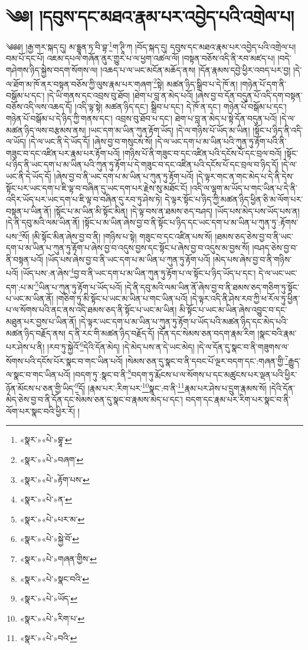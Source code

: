 \chapter{༄༅། །དབུས་དང་མཐའ་རྣམ་པར་འབྱེད་པའི་འགྲེལ་པ།}༄༅༅། །རྒྱ་གར་སྐད་དུ། མ་དྷྱཱན་ཏ་བི་བྷ་\footnote{«སྣར་»«པེ་»བྷཱ་}ག་ཊཱི་ཀ །བོད་སྐད་དུ། དབུས་དང་མཐའ་རྣམ་པར་འབྱེད་པའི་འགྲེལ་པ། བམ་པོ་དང་པོ། འཇམ་དཔལ་གཞོན་ནུར་གྱུར་པ་ལ་ཕྱག་འཚལ་ལོ། །བསྟན་བཅོས་འདི་ནི་རབ་མཛད་པ། །བདེ་གཤེགས་ཉིད་སྐྱེས་བདག་སོགས་ལ། །འཆད་པ་ལ་ཡང་མངོན་མཆོད་ནས། །དོན་རྣམས་དབྱེ་ཕྱིར་འབད་པར་བྱ། །དེ་ལ་ཐོག་མ་ཁོ་ནར་བསྟན་བཅོས་ཀྱི་ལུས་རྣམ་པར་གཞག་\footnote{«སྣར་»«པེ་»བཞག་}སྟེ། མཚན་ཉིད་སྒྲིབ་པ་དེ་ཁོ་ན། །གཉེན་པོ་དག་ནི་བསྒོམ་པ་དང་། །དེ་ཡི་གནས་དང་འབྲས་བུ་ཐོབ། །ཐེག་པ་བླ་ན་མེད་པའོ། །ཞེས་བྱ་བ་དོན་བདུན་པོ་འདི་དག་བསྟན་བཅོས་འདི་ལས་འཆད་དོ། །འདི་ལྟ་སྟེ། མཚན་ཉིད་དང་། སྒྲིབ་པ་དང་། དེ་ཁོ་ན་དང་། གཉེན་པོ་བསྒོམ་པ་དང་། གཉེན་པོ་བསྒོམ་པ་དེ་ཉིད་ཀྱི་གནས་དང་། འབྲས་བུ་ཐོབ་པ་དང་། ཐེག་པ་བླ་ན་མེད་པ་སྟེ་དོན་བདུན་པའོ། །དེ་ལ་མཚན་ཉིད་ལས་བརྩམས་ནས། །ཡང་དག་མ་ཡིན་ཀུན་རྟོག་ཡོད། །དེ་ལ་གཉིས་པོ་ཡོད་མ་ཡིན། །སྟོང་པ་ཉིད་ནི་འདི་ལ་ཡོད། །དེ་ལ་ཡང་ནི་དེ་ཡོད་དོ། །ཞེས་བྱ་བ་གསུངས་སོ། །དེ་ལ་ཡང་དག་པ་མ་ཡིན་པའི་ཀུན་ཏུ་རྟོག་པའི་ནི་གཟུང་བ་དང་འཛིན་པར་རྣམ་པར་རྟོག་པའོ། །གཉིས་པོ་ནི་གཟུང་བ་དང་འཛིན་པའི་དངོས་པོ་དང་བྲལ་བའོ། །སྟོང་པ་ཉིད་ནི་ཡང་དག་པ་མ་ཡིན་པའི་ཀུན་ཏུ་རྟོག་པ་དེ་གཟུང་བ་དང་འཛིན་པའི་དངོས་པོ་དང་བྲལ་བ་ཉིད་དོ། །དེ་ལ་ཡང་ནི་དེ་ཡོད་དོ། །ཞེས་བྱ་བ་ནི་ཡང་དག་པ་མ་ཡིན་པ་ཀུན་ཏུ་རྟོག་པའོ། །དེ་ལྟར་གང་ན་གང་མེད་པ་དེ་ནི་དེས་སྟོང་པར་ཡང་དག་པ་ཇི་ལྟ་བ་བཞིན་དུ་ཡང་དག་པར་རྗེས་སུ་མཐོང་ངོ། །འདི་ལ་ལྷག་མ་ཡོད་པ་གང་ཡིན་པ་དེ་ནི་འདིར་ཡོད་པར་ཡང་དག་པ་ཇི་ལྟ་བ་བཞིན་དུ་རབ་ཏུ་ཤེས་ཏེ། དེ་ལྟར་སྟོང་པ་ཉིད་ཀྱི་མཚན་ཉིད་ཕྱིན་ཅི་མ་ལོག་པར་བསྟན་པ་ཡིན་ནོ། །སྟོང་པ་མ་ཡིན་མི་སྟོང་མིན། །དེ་ལྟ་བས་ན་ཐམས་ཅད་བཤད། །ཡོད་པས་མེད་པས་ཡོད་པས་ན། །དེ་ནི་དབུ་མའི་ལམ་ཡིན་ནོ། །སྟོང་པ་མ་ཡིན་ཞེས་བྱ་བ་ནི་སྟོང་པ་ཉིད་དང་ཡང་དག་པ་མ་ཡིན་པ་ཀུན་ཏུ་:རྟོགས་པས་\footnote{«སྣར་»«པེ་»རྟོག་པས་}སོ། །མི་སྟོང་མིན་ཞེས་བྱ་བ་ནི། །གཉིས་པ་སྟེ། གཟུང་བ་དང་འཛིན་པས་སོ། །ཐམས་ཅད་ཅེས་བྱ་བ་ནི་ཡང་དག་པ་མ་ཡིན་པ་ཀུན་ཏུ་རྟོག་པ་ཞེས་བྱ་བ་འདུས་བྱས་དང་སྟོང་པ་ཞེས་བྱ་བ་འདུས་མ་བྱས་སོ། །བཤད་ཅེས་བྱ་བ་ནི་བསྟན་པའོ། །ཡོད་པས་ཞེས་བྱ་བ་ནི་ཡང་དག་པ་མ་ཡིན་པ་ཀུན་ཏུ་རྟོག་པའོ། །མེད་པས་ཞེས་བྱ་བ་ནི་གཉིས་པའོ། །ཡོད་པས་:ན་ཞེས་\footnote{«སྣར་»«པེ་»ན་}བྱ་བ་ནི་ཡང་དག་པ་མ་ཡིན་ཀུན་ཏུ་རྟོག་པ་ལ་སྟོང་པ་ཉིད་ཡོད་པ་དང་། དེ་ལ་ཡང་ཡང་དག་:པ་མ་\footnote{«སྣར་»«པེ་»པར་མ་}ཡིན་པ་ཀུན་ཏུ་རྟོག་པ་ཡོད་པའོ། །དེ་ནི་དབུ་མའི་ལམ་ཡིན་ནོ་ཞེས་བྱ་བ་ནི་ཐམས་ཅད་གཅིག་ཏུ་སྟོང་པ་ཡང་མ་ཡིན་ནོ། །གཅིག་ཏུ་མི་སྟོང་པ་ཡང་མ་ཡིན་པ་གང་ཡིན་པའོ། །དེ་ལྟར་འདི་ནི་ཤེས་རབ་ཀྱི་ཕ་རོལ་ཏུ་ཕྱིན་པ་ལ་སོགས་པའི་ནང་ནས་འདི་ཐམས་ཅད་ནི་སྟོང་པ་ཡང་མ་ཡིན། མི་སྟོང་པ་ཡང་མ་ཡིན་ཞེས་འབྱུང་བ་དང་མཐུན་པར་བྱས་པ་ཡིན་ནོ། །དེ་ལྟར་ཡང་དག་པ་མ་ཡིན་པ་ཀུན་ཏུ་རྟོག་པ་ཡོད་པའི་མཚན་ཉིད་དང་མེད་པའི་མཚན་ཉིད་བརྗོད་ནས། ད་ནི་རང་གི་མཚན་ཉིད་བརྗོད་དོ། །དོན་དང་སེམས་ཅན་བདག་རྣམ་རིག །སྣང་བའི་རྣམ་པར་ཤེས་པ་ནི། །རབ་ཏུ་སྐྱེའོ་\footnote{«སྣར་»«པེ་»སྐྱེ་བོ་}དེའི་དོན་མེད། །དེ་མེད་པས་ན་དེ་ཡང་མེད། །དེ་ལ་དོན་དུ་སྣང་བ་ནི་གཟུགས་ལ་སོགས་པའི་དངོས་པོར་སྣང་བ་གང་ཡིན་པའོ། །སེམས་ཅན་དུ་སྣང་བ་ནི་དབང་པོ་ལྔར་བདག་དང་:གཞན་གྱི་\footnote{«སྣར་»«པེ་»གཞན་གྱིས་}རྒྱུད་ལ་སྣང་བ་གང་ཡིན་པའོ། །བདག་ཏུ་:སྣང་བ་ནི་\footnote{«སྣར་»«པེ་»སྣང་བའི་}བདག་ཏུ་རྨོངས་པ་ལ་སོགས་པ་དང་མཚུངས་པར་ལྡན་པའི་ཕྱིར་ཉོན་མོངས་པ་ཅན་གྱི་ཡིད་\footnote{«སྣར་»«པེ་»ཡོད་}དོ། །རྣམ་པར་:རིག་པར་\footnote{«སྣར་»«པེ་»རིག་པ་}སྣང་:བ་ནི་\footnote{«སྣར་»«པེ་»བའི་}རྣམ་པར་ཤེས་པ་དྲུག་རྣམས་སོ། །དེའི་དོན་མེད་ཅེས་བྱ་བ་ནི་དོན་དང་སེམས་ཅན་དུ་སྣང་བ་རྣམས་མེད་པ་དང་། བདག་དང་རྣམ་པར་རིག་པར་སྣང་བ་ནི་ལོག་པར་སྣང་བའི་ཕྱིར་རོ། །
